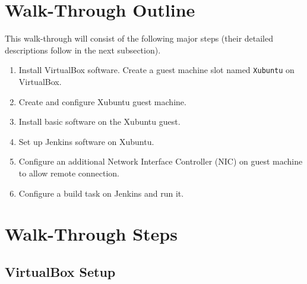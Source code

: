 \documentclass[11pt,a4paper]{article}
\begin{document}
\section{Walk-Through Outline}

This walk-through will consist of the following major steps (their detailed descriptions
follow in the next subsection).

\begin{enumerate}
\item Install VirtualBox software. Create a guest machine slot named {\tt Xubuntu} on VirtualBox. 
\item Create and configure Xubuntu guest machine.
\item Install basic software on the Xubuntu guest.
\item Set up Jenkins software on Xubuntu. 
\item Configure an additional Network Interface Controller (NIC) on guest machine 
to allow remote connection. 
\item Configure a build task on Jenkins and run it. 
\end{enumerate}






\section{Walk-Through Steps}

\subsection{VirtualBox Setup}
\end{document}
